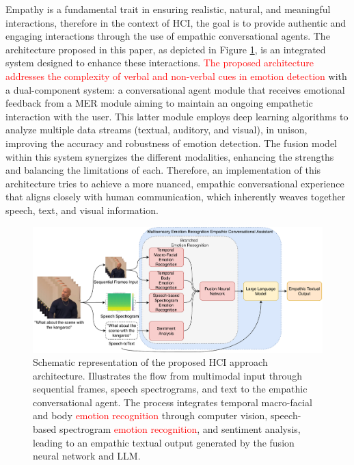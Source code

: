 \documentclass[runningheads]{llncs}
\begin{document}
Empathy is a fundamental trait in ensuring realistic, natural, and meaningful interactions, therefore in the context of HCI, the goal is to provide authentic and engaging interactions through the use of empathic conversational agents. The architecture proposed in this paper, as depicted in Figure \ref{fig:approachArchitecture}, is an integrated system designed to enhance these interactions. \textcolor{red}{The proposed architecture addresses the complexity of verbal and non-verbal cues in emotion detection} with a dual-component system: a conversational agent module that receives emotional feedback from a MER module aiming to maintain an ongoing empathetic interaction with the user. This latter module employs deep learning algorithms to analyze multiple data streams (textual, auditory, and visual), in unison, improving the accuracy and robustness of emotion detection. The fusion model within this system synergizes the different modalities, enhancing the strengths and balancing the limitations of each. Therefore, an implementation of this architecture tries to achieve a more nuanced, empathic conversational experience that aligns closely with human communication, which inherently weaves together speech, text, and visual information.

\begin{figure}[htb]
	\centering
	\includegraphics[width=0.97\linewidth]{approachArchitecture.pdf}
	\caption{Schematic representation of the proposed HCI approach architecture. Illustrates the flow from multimodal input through sequential frames, speech spectrograms, and text to the empathic conversational agent. The process integrates temporal macro-facial and body \textcolor{red}{emotion recognition} through computer vision, speech-based spectrogram \textcolor{red}{emotion recognition}, and sentiment analysis, leading to an empathic textual output generated by the fusion neural network and LLM.}
	\label{fig:approachArchitecture}
\end{figure}
\end{document}
